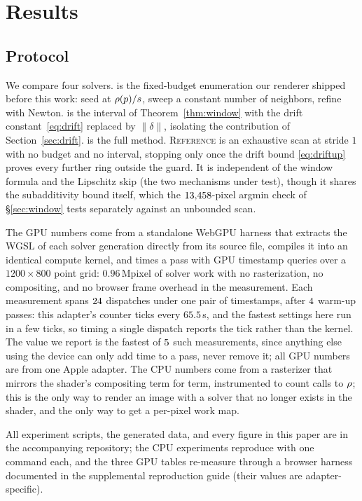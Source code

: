 \section{Results}
\label{sec:results}

\subsection{Protocol}
\label{sec:protocol}

We compare four solvers. \sweep{} is the fixed-budget enumeration our renderer
shipped before this work: seed at $\rho(p)/s$, sweep a constant number of
neighbors, refine with Newton. \loose{} is the interval of
Theorem~\ref{thm:window} with the drift constant~\eqref{eq:drift} replaced by
$\lVert\delta\rVert$, isolating the contribution of
Section~\ref{sec:drift}. \ours{} is the full method. \textsc{Reference} is an
exhaustive scan at stride $1$ with no budget and no interval, stopping only once
the drift bound \eqref{eq:driftup} proves every further ring outside the guard.
It is independent of the window formula and the Lipschitz skip (the two
mechanisms under test), though it shares the subadditivity bound itself,
which the $13{,}458$-pixel argmin check of \S\ref{sec:window} tests
separately against an unbounded scan.

The GPU numbers come from a standalone WebGPU harness that extracts the WGSL of
each solver generation directly from its source file, compiles it into an
identical compute kernel, and times a pass with GPU timestamp queries over a
$1200\times800$ point grid: $0.96$\,Mpixel of solver work with no
rasterization, no compositing, and no browser frame overhead in the measurement.
Each measurement spans $24$ dispatches under one pair of timestamps, after
$4$ warm-up passes: this adapter's counter ticks every $65.5$\,\textmu s,
and the fastest settings here run in a few ticks, so timing a single dispatch
reports the tick rather than the kernel. The value we report is the fastest of
$5$ such measurements, since anything else using the device can only add
time to a pass, never remove it; all GPU numbers are from one Apple
\texttt{\gpuAdapter} adapter. The CPU numbers come from a rasterizer that
mirrors the shader's compositing term for term, instrumented to count calls to
$\rho$; this is the only way to render an image with a solver that no longer
exists in the shader, and the only way to get a per-pixel work map.

All experiment scripts, the generated data, and every figure in this paper are in
the accompanying repository; the CPU experiments reproduce with one command
each, and the three GPU tables re-measure through a browser harness documented
in the supplemental reproduction guide (their values are adapter-specific).

